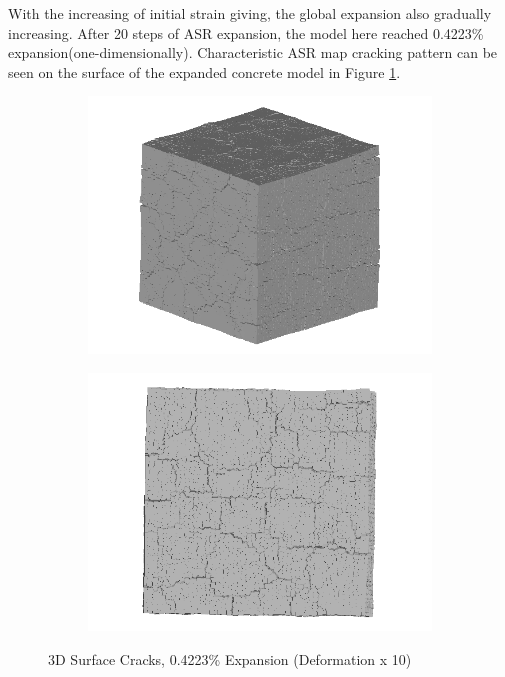 
With the increasing of initial strain giving, the global expansion also gradually increasing. After 20 steps of ASR expansion, the model here reached 0.4223\% expansion(one-dimensionally). Characteristic ASR map cracking pattern can be seen on the surface of the expanded concrete model in Figure \ref{fig:ASR_A30P75_3_3D_1}.

  \begin{figure}[ht]
  \centering
      \begin{subfigure}{.5\textwidth}
        \centering
        \includegraphics[width=.8\linewidth]{Files/exp_3D/ASR/A30P75_3_3d.png}
      \end{subfigure}%
      \begin{subfigure}{.5\textwidth}
        \centering
        \includegraphics[width=.8\linewidth]{Files/exp_3D/ASR/A30P75_3_3ds.png}
        \end{subfigure}
    \caption{3D Surface Cracks, 0.4223\% Expansion (Deformation x 10)}
    \label{fig:ASR_A30P75_3_3D_1}
  \end{figure}

